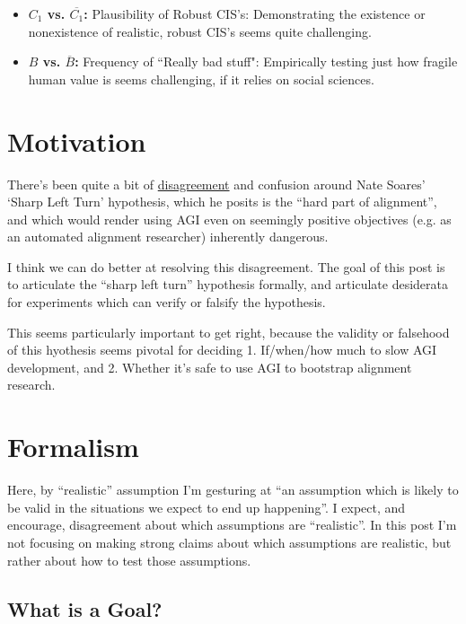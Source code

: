 \documentclass{article}
\begin{document}
\begin{itemize}
\begin{itemize}
        \item \textbf{$C_1$ vs. $\overline{C_1}$:} Plausibility of Robust CIS's: Demonstrating the existence or nonexistence of realistic, robust CIS's seems quite challenging.
        \item \textbf{$B$ vs. $\overline{B}$:} Frequency of ``Really bad stuff": Empirically testing just how fragile human value is seems challenging, if it relies on social sciences.
    \end{itemize}
\end{itemize}

\section{Motivation}
There's been quite a bit of \href{https://www.alignmentforum.org/posts/iy2o4nQj9DnQD7Yhj/discussion-with-nate-soares-on-a-key-alignment-difficulty}{disagreement} and confusion around Nate Soares' `Sharp Left Turn' hypothesis, which he posits is the ``hard part of alignment'', and which would render using AGI even on seemingly positive objectives (e.g. as an automated alignment researcher) inherently dangerous.

I think we can do better at resolving this disagreement. 
The goal of this post is to articulate the “sharp left turn” hypothesis formally, and articulate desiderata for experiments which can verify or falsify the hypothesis. 

This seems particularly important to get right, because the validity or falsehood of this hyothesis seems pivotal for deciding 1. If/when/how much to slow AGI development, and 2. Whether it’s safe to use AGI to bootstrap alignment research.

\section{Formalism}

Here, by “realistic” assumption I’m gesturing at “an assumption which is likely to be valid in the situations we expect to end up happening”. I expect, and encourage, disagreement about which assumptions are “realistic”. In this post I’m not focusing on making strong claims about which assumptions are realistic, but rather about how to test those assumptions.

\subsection{What is a Goal?}
\end{document}
